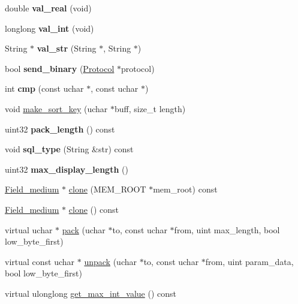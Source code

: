 \begin{DoxyCompactItemize}
double {\bfseries val\+\_\+real} (void)
\item 
\mbox{\label{classField__medium_a32092256dcd25c6d6614a6ece2d6d706}} 
longlong {\bfseries val\+\_\+int} (void)
\item 
\mbox{\label{classField__medium_abf4044af2a01c9e43c1fcabb74268283}} 
String $\ast$ {\bfseries val\+\_\+str} (String $\ast$, String $\ast$)
\item 
\mbox{\label{classField__medium_a6bdde92de397edda1f3d2404240faac7}} 
bool {\bfseries send\+\_\+binary} (\mbox{\hyperlink{classProtocol}{Protocol}} $\ast$protocol)
\item 
\mbox{\label{classField__medium_aea7e459d7731c27ded84a68aed0cf973}} 
int {\bfseries cmp} (const uchar $\ast$, const uchar $\ast$)
\item 
void \mbox{\hyperlink{classField__medium_a4a1a61100d554bba90a37139c41b7e6f}{make\+\_\+sort\+\_\+key}} (uchar $\ast$buff, size\+\_\+t length)
\item 
\mbox{\label{classField__medium_a45fc0bfffee500ea919260d489cf3412}} 
uint32 {\bfseries pack\+\_\+length} () const
\item 
\mbox{\label{classField__medium_aff5c12df6b21db0d997167c265019af1}} 
void {\bfseries sql\+\_\+type} (String \&str) const
\item 
\mbox{\label{classField__medium_a4ee0864a4e26c728144af423ee8ef54e}} 
uint32 {\bfseries max\+\_\+display\+\_\+length} ()
\item 
\mbox{\hyperlink{classField__medium}{Field\+\_\+medium}} $\ast$ \mbox{\hyperlink{classField__medium_a6e9367d7b4a2f52eca8ec485f62c18e3}{clone}} (M\+E\+M\+\_\+\+R\+O\+OT $\ast$mem\+\_\+root) const
\item 
\mbox{\hyperlink{classField__medium}{Field\+\_\+medium}} $\ast$ \mbox{\hyperlink{classField__medium_a4fdbb87b4163ca66467d2e4aabea6b4d}{clone}} () const
\item 
virtual uchar $\ast$ \mbox{\hyperlink{classField__medium_a1c93838ae85a69a18a5d3e88da916369}{pack}} (uchar $\ast$to, const uchar $\ast$from, uint max\+\_\+length, bool low\+\_\+byte\+\_\+first)
\item 
virtual const uchar $\ast$ \mbox{\hyperlink{classField__medium_aa04c697b728c9f1f6c92164d85894030}{unpack}} (uchar $\ast$to, const uchar $\ast$from, uint param\+\_\+data, bool low\+\_\+byte\+\_\+first)
\item 
virtual ulonglong \mbox{\hyperlink{classField__medium_a0b9e2f14c21e9312a9f014f24a9f95d3}{get\+\_\+max\+\_\+int\+\_\+value}} () const
\end{DoxyCompactItemize}
